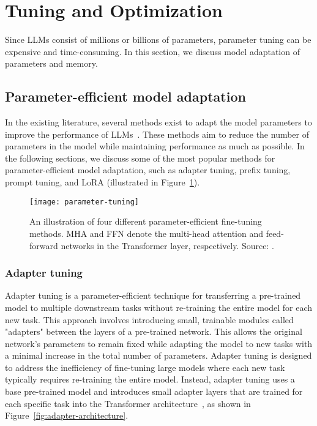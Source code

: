 \section{Tuning and Optimization}
\label{sec:tuning-optimization}

Since LLMs consist of millions or billions of parameters, parameter tuning can be expensive and time-consuming.
In this section, we discuss model adaptation of parameters and memory.

\subsection{Parameter-efficient model adaptation}
\label{subsec:parameter-efficient}

In the existing literature, several methods exist to adapt the model parameters to improve the performance of LLMs~\cite{hu2021lora, li2021prefixtuning, lester2021power}.
These methods aim to reduce the number of parameters in the model while maintaining performance as much as possible.
In the following sections, we discuss some of the most popular methods for parameter-efficient model adaptation, such as adapter tuning, prefix tuning, prompt tuning, and LoRA (illustrated in Figure~\ref{fig:parameter-tuning}).

\begin{figure}[h]
	\centering
	\texttt{[image: parameter-tuning]}
	\caption{An illustration of four different parameter-efficient fine-tuning methods. MHA and FFN denote the multi-head
		attention and feed-forward networks in the Transformer layer, respectively. Source: \textcite{survey}.}
	\label{fig:parameter-tuning}
\end{figure}

\subsubsection{Adapter tuning}
\label{subsubsec:adapter-tuning}

Adapter tuning is a parameter-efficient technique for transferring a pre-trained model to multiple downstream tasks without re-training the entire model for each new task.
This approach involves introducing small, trainable modules called "adapters" between the layers of a pre-trained network.
This allows the original network's parameters to remain fixed while adapting the model to new tasks with a minimal increase in the total number of parameters.
Adapter tuning is designed to address the inefficiency of fine-tuning large models where each new task typically requires re-training the entire model.
Instead, adapter tuning uses a base pre-trained model and introduces small adapter layers that are trained for each specific task into the Transformer architecture~\cite{houlsby2019parameterefficient, hu2023llmadapters}, as shown in Figure~\ref{fig:adapter-architecture}.

